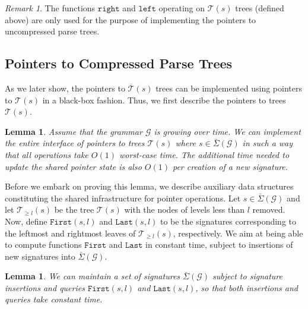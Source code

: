 \documentclass[a4paper]{article}
\newtheorem{lemma}[theorem]{Lemma}
\theoremstyle{remark}
\newtheorem{remark}[theorem]{Remark}
\newcommand{\sigs}{\bar{\Sigma}}
\newcommand{\grammar}{\mathcal{G}}
\newcommand{\stree}{\mathcal{T}}
\newcommand{\ustree}{\mathcal{\overline{T}}}
\newcommand{\itleft}{\mathtt{left}}
\newcommand{\itright}{\mathtt{right}}
\newcommand{\itfirst}{\mathtt{First}}
\newcommand{\itlast}{\mathtt{Last}}
\begin{document}
\begin{remark}The functions $\itright$ and $\itleft$ operating on $\stree(s)$ trees
(defined above)
are only used for the purpose of implementing the pointers to uncompressed
parse trees.
\end{remark}
\subsection{Pointers to Compressed Parse Trees}
As we later show, the pointers to $\ustree(s)$ trees can be implemented using pointers to $\stree(s)$ in a black-box fashion.
Thus, we first describe the pointers to trees $\stree(s)$.

\begin{lemma}\label{lem:ptr}
Assume that the grammar $\grammar$ is growing over time.
We can implement the entire interface of pointers to trees $\stree(s)$ where
$s\in\sigs(\grammar)$
in such a way that all operations take $O(1)$ worst-case time.
The additional time needed to update the shared pointer state is also $O(1)$ per creation of a new signature.
\end{lemma}
Before we embark on proving this lemma, we describe auxiliary
data structures constituting the shared infrastructure for pointer
operations.
Let $s\in\sigs(\grammar)$ and let $\stree_{\geq l}(s)$ be the tree $\stree(s)$
with the nodes of levels less than $l$ removed.
Now, define $\itfirst(s,l)$ and $\itlast(s,l)$ to be the signatures
corresponding to the leftmost and rightmost
leaves of $\stree_{\geq l}(s)$, respectively.
We aim at being able to compute functions $\itfirst$ and $\itlast$ in
constant time, subject to insertions of new signatures
into $\sigs(\grammar)$.

\newcommand{\bmask}{\mathtt{b}}
\newcommand{\bcnt}{\mathtt{bcnt}}

\begin{lemma}
  We can maintain a set of signatures $\sigs(\grammar)$ subject
to signature insertions and queries $\itfirst(s,l)$ and
$\itlast(s,l)$, so that both insertions and queries take constant time.
\end{lemma}
\end{document}
